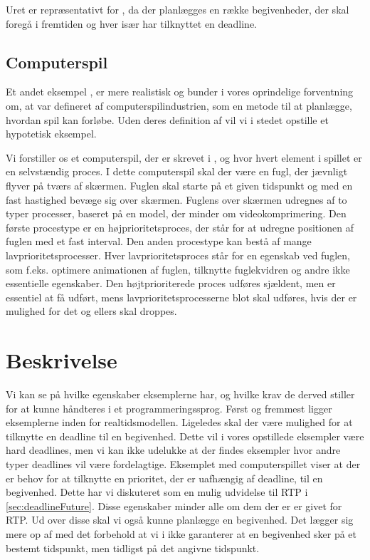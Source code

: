 Uret er repræsentativt for \is, da der planlægges en række begivenheder, der skal foregå i fremtiden og hver især har tilknyttet en deadline.

\subsection{Computerspil}
Et andet eksempel , er mere realistisk og bunder i vores oprindelige forventning om, at \is  var defineret af computerspilindustrien, som en metode til at planlægge, hvordan spil kan forløbe. Uden deres definition af \is vil vi i stedet opstille et hypotetisk eksempel. 

Vi forstiller os et computerspil, der er skrevet i \pycsp, og hvor hvert element i spillet er en selvstændig proces. I dette computerspil skal der være en fugl, der jævnligt flyver på tværs af skærmen. Fuglen skal starte på et given tidspunkt og med en fast hastighed bevæge sig over skærmen. Fuglens  over skærmen udregnes af to typer processer, baseret på en model, der minder om videokomprimering. Den første procestype er en højprioritetsproces, der står for at udregne positionen af fuglen med  et fast interval. Den anden procestype kan bestå af mange lavprioritetsprocesser. Hver lavprioritetsproces står for en egenskab ved fuglen, som  f.eks. optimere animationen af fuglen, tilknytte fuglekvidren og andre ikke essentielle egenskaber. Den højtprioriterede proces udføres sjældent, men er essentiel at få udført, mens lavprioritetsprocesserne blot skal udføres, hvis der er mulighed for det og ellers skal droppes.

\section{Beskrivelse}
Vi kan se på hvilke egenskaber eksemplerne har, og hvilke krav de derved stiller for at kunne håndteres i et programmeringssprog. Først og fremmest ligger eksemplerne  inden for realtidsmodellen. Ligeledes skal der være mulighed for at tilknytte en deadline til en begivenhed. Dette vil i vores opstillede eksempler være hard deadlines, men vi kan ikke udelukke at der findes eksempler hvor andre typer deadlines vil være fordelagtige. Eksemplet med computerspillet viser at der er behov for at tilknytte en prioritet, der er uafhængig af deadline, til en begivenhed. Dette har vi diskuteret som en mulig udvidelse til RTP i \cref{sec:deadlineFuture}. Disse egenskaber minder alle om dem der er er givet for RTP. Ud over disse skal vi også kunne planlægge en begivenhed. Det lægger sig mere op af \des med det forbehold at vi i \is ikke garanterer at en begivenhed sker på et bestemt tidspunkt, men tidligst på det angivne tidspunkt.  

